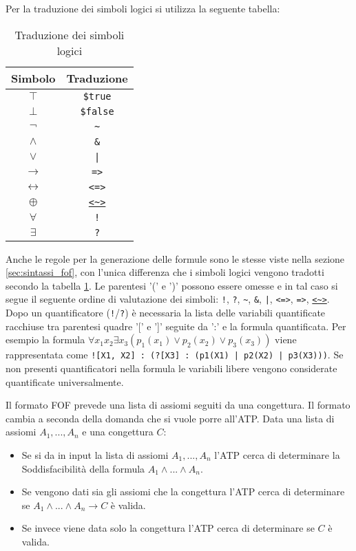 \documentclass[./main.tex]{subfiles}
\begin{document}
Per la traduzione dei simboli logici si utilizza la seguente tabella:

\begin{table}[H]
  \centering
  \begin{tabular}{|c|c|}
    \hline
    \textbf{Simbolo} & \textbf{Traduzione} \\
    \hline
    $\top$ & \texttt{\$true} \\
    $\bot$ & \texttt{\$false} \\
    $\lnot$ & \texttt{\~} \\
    $\land$ & \texttt{\&} \\
    $\lor$ & \texttt{|} \\
    $\rightarrow$ & \texttt{=>} \\
    $\leftrightarrow$ & \texttt{<=>} \\
    $\oplus$ & \texttt{\url{<~>}} \\
    $\forall$ & \texttt{!} \\
    $\exists$ & \texttt{?} \\
    \hline
  \end{tabular}
  \caption{Traduzione dei simboli logici}
  \label{tab:traduzione_simboli_logici}
\end{table}


Anche le regole per la generazione delle formule sono le stesse viste nella sezione \ref{sec:sintassi_fof},
con l'unica differenza che i simboli logici vengono tradotti secondo la tabella \ref{tab:traduzione_simboli_logici}.
Le parentesi '(' e ')' possono essere omesse e in tal caso si segue il seguente ordine di valutazione dei simboli:
\texttt{!}, \texttt{?}, \texttt{\textasciitilde}, \texttt{\&}, \texttt{|}, \texttt{<=>}, \texttt{=>}, \texttt{\url{<~>}}.
Dopo un quantificatore (\texttt{!}/\texttt{?}) è necessaria la lista delle variabili quantificate racchiuse tra parentesi quadre '[' e ']' 
seguite da ':' e la formula quantificata.
Per esempio la formula $\forall x_1 x_2 \exists x_3 (p_1(x_1) \lor p_2(x_2) \lor p_3(x_3))$ viene 
rappresentata come \texttt{![X1, X2] : (?[X3] : (p1(X1) | p2(X2) | p3(X3)))}.
Se non presenti quantificatori nella formula le variabili libere vengono considerate quantificate universalmente.


Il formato FOF prevede una lista di assiomi seguiti da una congettura. 
Il formato cambia a seconda della domanda che si vuole porre all'ATP.
Data una lista di assiomi $A_1, ..., A_n$ e una congettura $C$:

\begin{itemize}
  \item Se si da in input la lista di assiomi $A_1, ..., A_n$ l'ATP cerca di determinare la Soddisfacibilità della formula $A_1 \land ... \land A_n$.
  \item Se vengono dati sia gli assiomi che la congettura l'ATP cerca di determinare se $A_1 \land ... \land A_n \rightarrow C$ è valida.
  \item Se invece viene data solo la congettura l'ATP cerca di determinare se $C$ è valida.
\end{itemize}
\end{document}
